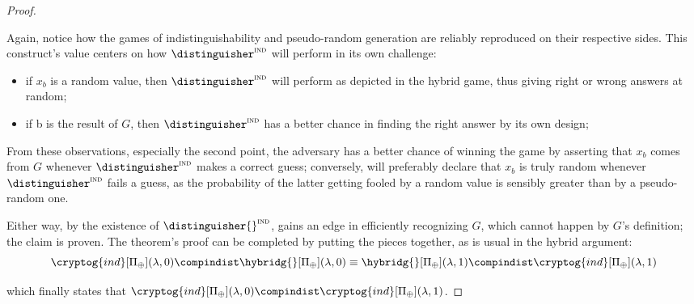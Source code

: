 \begin{proof}
\begin{cryptoredux}




        \cseqdelay

    \end{cryptoredux}

    Again, notice how the games of indistinguishability and pseudo-random generation are reliably reproduced on their respective sides. This construct's value centers on how $\distinguisher^\textsc{ind}$ will perform in its own challenge:
    \begin{itemize}
        \item if $x_b$ is a random value, then $\distinguisher^\textsc{ind}$ will perform as depicted in the hybrid game, thus giving right or wrong answers at random;
        \item if b is the result of $G$, then $\distinguisher^\textsc{ind}$ has a better chance in finding the right answer by its own design;
    \end{itemize}
    From these observations, especially the second point, the adversary \adversary{} has a better chance of winning the \prg{} game by asserting that $x_b$ comes from $G$ whenever $\distinguisher^\textsc{ind}$ makes a correct guess; conversely, \adversary{} will preferably declare that $x_b$ is truly random whenever $\distinguisher^\textsc{ind}$ fails a guess, as the probability of the latter getting fooled by a random value is sensibly greater than by a pseudo-random one.

    Either way, by the existence of $\distinguisher{}^\textsc{ind}$, \adversary{} gains an edge in efficiently recognizing $G$, which cannot happen by $G$'s definition; the claim is proven. The theorem's proof can be completed by putting the pieces together, as is usual in the hybrid argument:
    \[
        \cryptog{ind}[\Pi_\oplus](\lambda, 0) \compindist
        \hybridg{}[\Pi_\oplus](\lambda, 0) \equiv
        \hybridg{}[\Pi_\oplus](\lambda, 1) \compindist
        \cryptog{ind}[\Pi_\oplus](\lambda, 1)
    \]

    which finally states that $\cryptog{ind}[\Pi_\oplus](\lambda, 0) \compindist \cryptog{ind}[\Pi_\oplus](\lambda, 1)$.
\end{proof}
 

